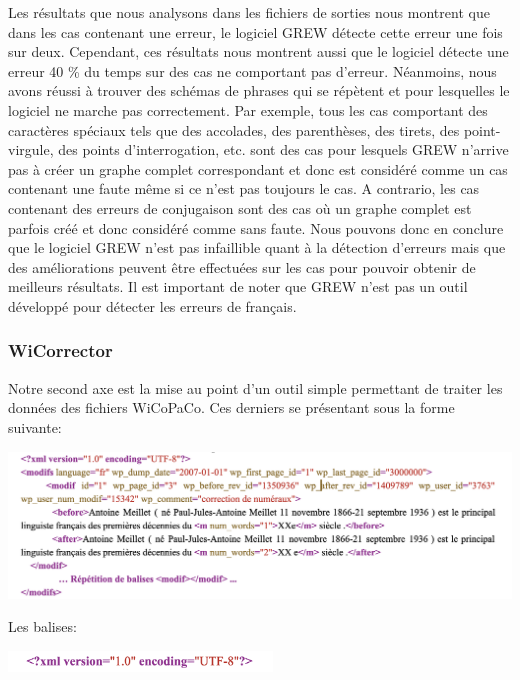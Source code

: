 \documentclass[11pt]{article}
\begin{document}
Les r\'{e}sultats que nous analysons dans les fichiers de sorties nous montrent que dans les cas contenant une erreur, le logiciel GREW d\'{e}tecte cette erreur une fois sur deux. Cependant, ces r\'{e}sultats nous montrent aussi que le logiciel d\'{e}tecte une erreur 40 \% du temps sur des cas ne comportant pas d'erreur. N\'{e}anmoins, nous avons r\'{e}ussi \`{a} trouver des sch\'{e}mas de phrases qui se r\'{e}p\`{e}tent et pour lesquelles le logiciel ne marche pas correctement. Par exemple, tous les cas comportant des caract\`{e}res sp\'{e}ciaux tels que des accolades, des parenth\`{e}ses, des tirets, des point-virgule, des points d'interrogation, etc. sont des cas pour lesquels GREW n'arrive pas \`{a} cr\'{e}er un graphe complet correspondant et donc est consid\'{e}r\'{e} comme un cas contenant une faute m\^{e}me si ce n'est pas toujours le cas. A contrario, les cas contenant des erreurs de conjugaison sont des cas o\`{u} un graphe complet est parfois cr\'{e}\'{e} et donc consid\'{e}r\'{e} comme sans faute. Nous pouvons donc en conclure que le logiciel GREW n'est pas infaillible quant \`{a} la d\'{e}tection d'erreurs mais que des am\'{e}liorations peuvent \^{e}tre effectu\'{e}es sur les cas pour pouvoir obtenir de meilleurs r\'{e}sultats. Il est important de noter que GREW n'est pas un outil d\'{e}velopp\'{e} pour d\'{e}tecter les erreurs de fran\c{c}ais.


\subsubsection{WiCorrector}
Notre second axe est la mise au point d'un outil simple permettant de traiter les donn\'{e}es des fichiers WiCoPaCo. Ces derniers se pr\'{e}sentant sous la forme suivante:
\begin{center}
\includegraphics[width=14cm]{exemple4.png} %
\end{center}

Les balises:
\begin{center}
\includegraphics[width=7cm]{exemple5.png} %
\end{center}
\end{document}
